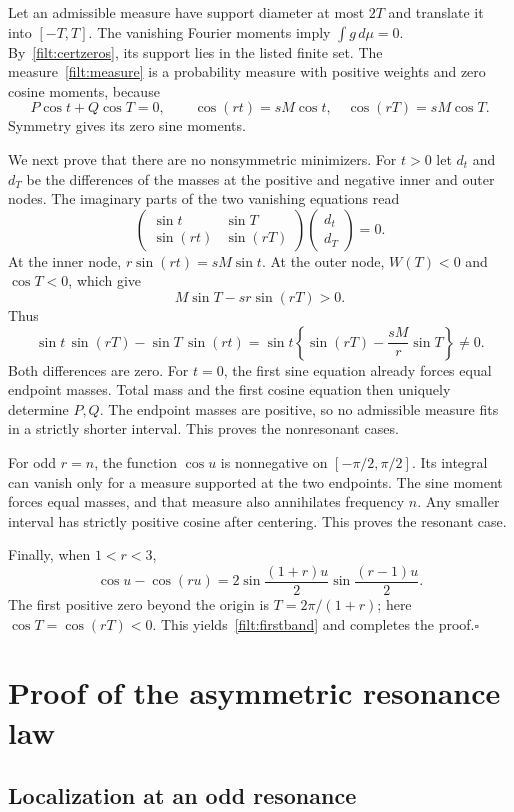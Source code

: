 Let an admissible measure have support diameter at most $2T$ and translate
it into $[-T,T]$.  The vanishing Fourier moments imply
$\int g\,d\mu=0$.  By~\eqref{filt:certzeros}, its support lies in the listed
finite set.  The measure~\eqref{filt:measure} is a probability measure with
positive weights and zero cosine moments, because
\[
 P\cos t+Q\cos T=0,
 \qquad \cos(rt)=sM\cos t,\quad
 \cos(rT)=sM\cos T.
\]
Symmetry gives its zero sine moments.

We next prove that there are no nonsymmetric minimizers.  For $t>0$ let
$d_t$ and $d_T$ be the differences of the masses at the positive and negative
inner and outer nodes.  The imaginary parts of the two vanishing equations
read
\[
 \begin{pmatrix}\sin t&\sin T\\\sin(rt)&\sin(rT)\end{pmatrix}
 \begin{pmatrix}d_t\\d_T\end{pmatrix}=0.
\]
At the inner node, $r\sin(rt)=sM\sin t$.  At the outer node,
$W(T)<0$ and $\cos T<0$, which give
\[
 M\sin T-sr\sin(rT)>0.
\]
Thus
\[
 \sin t\,\sin(rT)-\sin T\,\sin(rt)
 =\sin t\left\{\sin(rT)-\frac{sM}{r}\sin T\right\}\ne0.
\]
Both differences are zero.  For $t=0$, the first sine equation already
forces equal endpoint masses.  Total mass and the first cosine equation
then uniquely determine $P,Q$.  The endpoint masses are positive, so no
admissible measure fits in a strictly shorter interval.  This proves the
nonresonant cases.

For odd $r=n$, the function $\cos u$ is nonnegative on
$[-\pi/2,\pi/2]$.  Its integral can vanish only for a measure supported at
the two endpoints.  The sine moment forces equal masses, and that measure
also annihilates frequency $n$.  Any smaller interval has strictly positive
cosine after centering.  This proves the resonant case.

Finally, when $1<r<3$,
\[
 \cos u-\cos(ru)
 =2\sin\frac{(1+r)u}{2}\sin\frac{(r-1)u}{2}.
\]
The first positive zero beyond the origin is $T=2\pi/(1+r)$; here
$\cos T=\cos(rT)<0$.  This yields~\eqref{filt:firstband} and completes the
proof.\hfill$\square$

\section{Proof of the asymmetric resonance law}

\subsection{Localization at an odd resonance}

